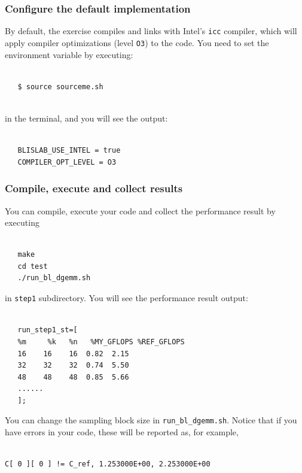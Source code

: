 \subsubsection{Configure the default implementation}
By default, the exercise compiles and links with Intel's {\tt icc} compiler, which will apply compiler optimizations (level {\tt O3}) to the code.
You need to set the environment variable by executing:
\begin{verbatim}

   $ source sourceme.sh
   
\end{verbatim}
in the terminal, and you will see the output:
\begin{verbatim}

   BLISLAB_USE_INTEL = true
   COMPILER_OPT_LEVEL = O3

\end{verbatim}

\subsubsection{Compile, execute and collect results}
You can compile, execute your code and collect the performance result by executing
\begin{verbatim}

   make
   cd test
   ./run_bl_dgemm.sh

\end{verbatim}
in {\tt step1} subdirectory. You will see the performance result output:
\begin{verbatim}

   run_step1_st=[
   %m     %k   %n   %MY_GFLOPS %REF_GFLOPS
   16    16    16  0.82  2.15
   32    32    32  0.74  5.50
   48    48    48  0.85  5.66
   ......
   ];

\end{verbatim}
You can change the sampling block size in {\tt run\_bl\_dgemm.sh}.
Notice that if you have errors in your code, these will be reported as, for example, 
\begin{verbatim}

C[ 0 ][ 0 ] != C_ref, 1.253000E+00, 2.253000E+00

\end{verbatim}

